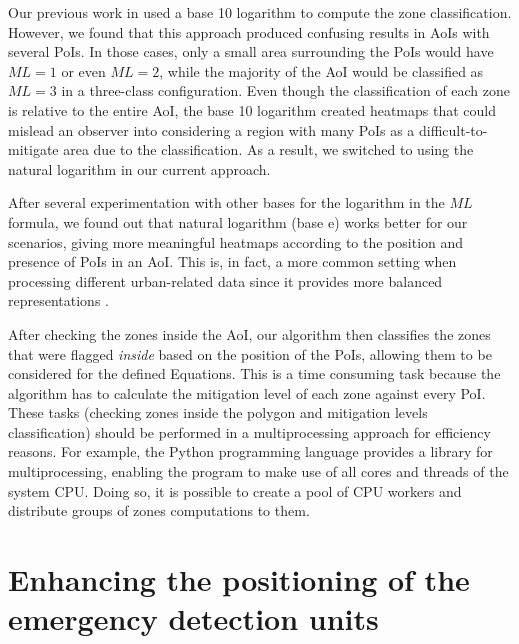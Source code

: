 \begin{refsection}
Our previous work in \cite{riskzones} used a base 10 logarithm to compute the zone classification. However, we found that this approach produced confusing results in AoIs with several PoIs. In those cases, only a small area surrounding the PoIs would have $ML=1$ or even $ML=2$, while the majority of the AoI would be classified as $ML=3$ in a three-class configuration. Even though the classification of each zone is relative to the entire AoI, the base 10 logarithm created heatmaps that could mislead an observer into considering a region with many PoIs as a difficult-to-mitigate area due to the classification. As a result, we switched to using the natural logarithm in our current approach.

After several experimentation with other bases for the logarithm in the $ML$ formula, we found out that natural logarithm (base $\mathrm{e}$) works better for our scenarios, giving more meaningful heatmaps according to the position and presence of PoIs in an AoI. This is, in fact, a more common setting when processing different urban-related data since it provides more balanced representations \cite{log1,log2}. 

After checking the zones inside the AoI, our algorithm then classifies the zones that were flagged \emph{inside} based on the position of the PoIs, allowing them to be considered for the defined Equations. This is a time consuming task because the algorithm has to calculate the mitigation level of each zone against every PoI. These tasks (checking zones inside the polygon and mitigation levels classification) should be performed in a multiprocessing approach for efficiency reasons. For example, the Python programming language provides a library for multiprocessing, enabling the program to make use of all cores and threads of the system CPU. Doing so, it is possible to create a pool of CPU workers and distribute groups of zones computations to them. %

\section{Enhancing the positioning of the emergency detection units}\label{sec:positioning}



\end{refsection}
